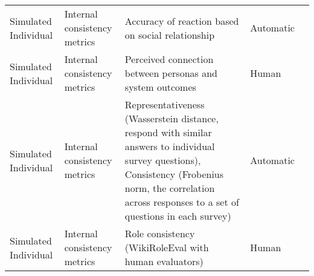 \begin{small}
\begin{center}
\begin{longtable}{@{}p{}p{}p{}p{}p{}@{}}
Simulated Individual     & Internal consistency metrics        & Accuracy of reaction based on social relationship                                                                                                                                                           & Automatic & \cite{liu2024roleagent}                                                                                                                                                                                                                                                                                                                                                                                           \\
Simulated Individual     & Internal consistency metrics        & Perceived connection between personas and system outcomes                                                                                                                                                   & Human     & \cite{10.1145/3613904.3642363}                                                                                                                                                                                                                                                                                                                                                                                    \\
Simulated Individual     & Internal consistency metrics        & Representativeness (Wasserstein distance, respond with similar answers to individual survey questions), Consistency (Frobenius norm, the correlation across responses to a set of questions in each survey) & Automatic & \cite{moon2024virtualpersonaslanguagemodels}                                                                                                                                                                                                                                                                                                                                                                                                 \\
Simulated Individual     & Internal consistency metrics        & Role consistency (WikiRoleEval with human evaluators)                                                                                                                                                       & Human     & \cite{tang2024erabalenhancingroleplayingagents}                                                                                                                                                                                                                                                                                                                                                                                              \\

\end{longtable}
\end{center}
\end{small}
